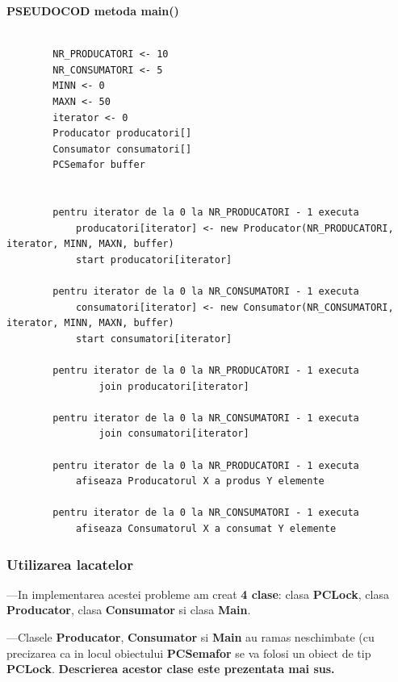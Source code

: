 \documentclass[14pt]{article}
\begin{document}
 \textbf{PSEUDOCOD metoda main()}
 \begin{lstlisting}
 
        NR_PRODUCATORI <- 10
        NR_CONSUMATORI <- 5
        MINN <- 0
        MAXN <- 50
        iterator <- 0
        Producator producatori[]
        Consumator consumatori[]
        PCSemafor buffer

        
		pentru iterator de la 0 la NR_PRODUCATORI - 1 executa
			producatori[iterator] <- new Producator(NR_PRODUCATORI, iterator, MINN, MAXN, buffer)
			start producatori[iterator]

		pentru iterator de la 0 la NR_CONSUMATORI - 1 executa
			consumatori[iterator] <- new Consumator(NR_CONSUMATORI, iterator, MINN, MAXN, buffer)
			start consumatori[iterator]
		
		pentru iterator de la 0 la NR_PRODUCATORI - 1 executa
				join producatori[iterator]

		pentru iterator de la 0 la NR_CONSUMATORI - 1 executa
				join consumatori[iterator]

		pentru iterator de la 0 la NR_PRODUCATORI - 1 executa
			afiseaza Producatorul X a produs Y elemente
		
		pentru iterator de la 0 la NR_CONSUMATORI - 1 executa 
			afiseaza Consumatorul X a consumat Y elemente

\end{lstlisting}


\subsubsection{\textbf{Utilizarea lacatelor}}

\vspace{2 mm}

---In implementarea acestei probleme am creat \textbf{4 clase}:  clasa \textbf{PCLock}, clasa \textbf{Producator}, clasa  \textbf{Consumator} si clasa \textbf{Main}.

\vspace{4 mm}

---Clasele \textbf{Producator}, \textbf{Consumator} si \textbf{Main} au ramas neschimbate (cu precizarea ca in locul obiectului \textbf{PCSemafor} se va folosi un obiect de tip \textbf{PCLock}. \textbf{Descrierea acestor clase este prezentata mai sus.}

\vspace{4 mm}
\end{document}
